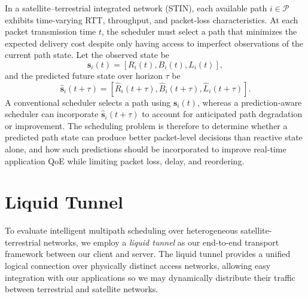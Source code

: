 \documentclass[sigconf,nonacm]{acmart}
\begin{document}
In a satellite--terrestrial integrated network (STIN), each available path $i \in \mathcal{P}$ exhibits time-varying RTT, throughput, and packet-loss characteristics. At each packet transmission time $t$, the scheduler must select a path that minimizes the expected delivery cost despite only having access to imperfect observations of the current path state. Let the observed state be
\[
\mathbf{s}_i(t) =
\left[R_i(t), B_i(t), L_i(t)\right],
\]
and the predicted future state over horizon $\tau$ be
\[
\hat{\mathbf{s}}_i(t+\tau) =
\left[\hat{R}_i(t+\tau),\hat{B}_i(t+\tau),\hat{L}_i(t+\tau)\right].
\]
A conventional scheduler selects a path using $\mathbf{s}_i(t)$, whereas a prediction-aware scheduler can incorporate $\hat{\mathbf{s}}_i(t+\tau)$ to account for anticipated path degradation or improvement. The scheduling problem is therefore to determine whether a predicted path state can produce better packet-level decisions than reactive state alone, and how such predictions should be incorporated to improve real-time application QoE while limiting packet loss, delay, and reordering.

\section{Liquid Tunnel}
\label{sec:liquid_tunnel}

To evaluate intelligent multipath scheduling over heterogeneous satellite-terrestrial networks, we employ a \emph{liquid tunnel} as our end-to-end transport framework between our client and server. The liquid tunnel provides a unified logical connection over physically distinct access networks, allowing easy integration with our applications so we may dynamically distribute their traffic between terrestrial and satellite networks. 


\end{document}

